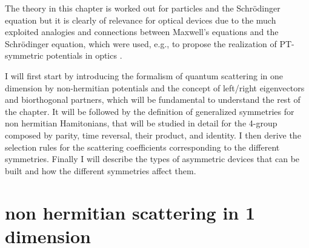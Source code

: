 The theory in this chapter is worked out for particles and the Schr\"odinger equation but it is clearly of relevance for optical devices
due to the much exploited analogies and connections between Maxwell's equations and the Schr\"odinger equation,
which were used, e.g., to propose  the realization of PT-symmetric potentials in optics \cite{Ruschhaupt2005}.

I will first start by introducing the formalism of quantum scattering in one dimension by non-hermitian potentials and the concept of left/right eigenvectors and biorthogonal partners, which will be fundamental to understand the rest of the chapter. It will be followed by the definition of generalized symmetries for non hermitian Hamitonians, that will be studied in detail for the 4-group composed by parity, time reversal, their product, and identity. I then derive the selection rules for the scattering coefficients corresponding to the different symmetries. Finally I will describe the types of asymmetric devices that can be built and how the different symmetries affect them.


\section{non hermitian scattering in 1 dimension \label{sec:chapter1_ScattFormalism}}

